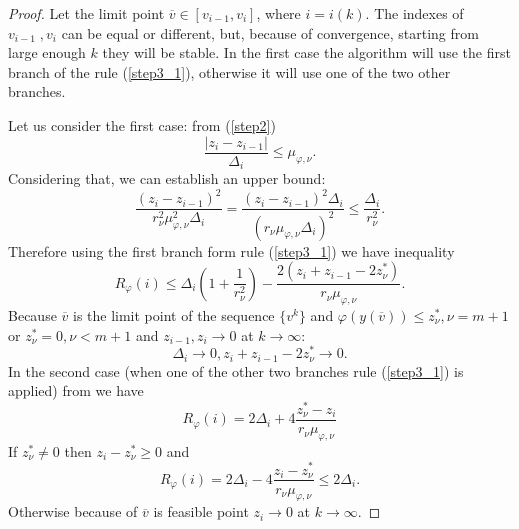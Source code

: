 \documentclass[runningheads]{llncs}
\begin{document}
\begin{proof}
  Let the limit point \(\overline{v}\in [v_{i-1},v_i]\), where \(i=i(k)\). The indexes of \(v_{i-1}\;,v_i\)
  can be equal or different, but, because of convergence, starting from large enough \(k\) they will be stable.
  In the first case the algorithm will use the first branch of the rule (\ref{step3_1}), otherwise it will use
  one of the two other branches.

  Let us consider the first case: from (\ref{step2})
  \begin{displaymath}
    \frac{|z_i-z_{i-1}|}{\Delta_i} \leqslant \mu_{\varphi,\nu}.
  \end{displaymath}
  Considering that, we can establish an upper bound:
  \begin{displaymath}
    \frac{(z_i-z_{i-1})^2}{r_\nu^2\mu_{\varphi,\nu}^2\Delta_i}=\frac{(z_i-z_{i-1})^2\Delta_i}{(r_\nu\mu_{\varphi,\nu}\Delta_i)^2}
    \leqslant \frac{\Delta_i}{r_\nu^2}.
  \end{displaymath}
  Therefore using the first branch form rule (\ref{step3_1}) we have inequality
  \begin{equation}
    \label{eq:th1}
    R_\varphi(i)\leqslant\Delta_i(1 + \frac{1}{r_\nu^2}) - \frac{2(z_i+z_{i-1}-2z^*_\nu)}{r_\nu\mu_{\varphi,\nu}}.
  \end{equation}
  Because \(\overline{v}\) is the limit point of the sequence \(\{v^k\}\) and \(\varphi(y(\overline{v}))\leqslant z^*_{\nu}, \nu=m+1\) or
  \(z^*_\nu=0, \nu<m+1\) and \(z_{i-1},z_i\to 0\) at \(k\to\infty\):
  \begin{equation}
    \label{eq:th2}
    \Delta_i\to 0, z_i+z_{i-1} - 2 z_\nu^*\to 0.
  \end{equation}
  In the second case (when one of the other two branches rule (\ref{step3_1}) is applied) from we have
  \begin{displaymath}
    R_\varphi(i)=2\Delta_i + 4\frac{z^*_\nu-z_i}{r_\nu\mu_{\varphi,\nu}}
  \end{displaymath}
  If \(z^*_\nu \ne 0\) then \(z_i-z^*_\nu \geqslant 0\) and
  \begin{equation}
    \label{eq:th3}
    R_\varphi(i)=2\Delta_i - 4\frac{z_i-z^*_\nu}{r_\nu\mu_{\varphi,\nu}} \leqslant 2\Delta_i.
  \end{equation}
  Otherwise because of \(\overline{v}\) is feasible point \(z_i\to 0\) at \(k\to\infty\).


\end{proof}
\end{document}
